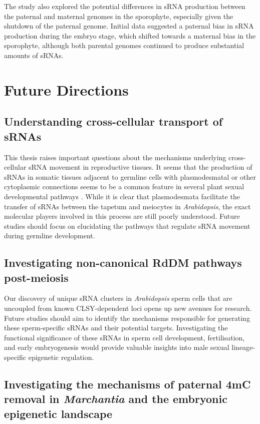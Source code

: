 The study also explored the potential differences in sRNA production between the paternal and maternal genomes in the sporophyte, especially given the shutdown of the paternal genome. Initial data suggested a paternal bias in sRNA production during the embryo stage, which shifted towards a maternal bias in the sporophyte, although both parental genomes continued to produce substantial amounts of sRNAs.

\section{Future Directions}

\subsection{Understanding cross-cellular transport of sRNAs}

This thesis raises important questions about the mechanisms underlying cross-cellular sRNA movement in reproductive tissues. It seems that the production of sRNAs in somatic tissues adjacent to germline cells with plasmodesmatal or other cytoplasmic connections seems to be a common feature in several plant sexual developmental pathways \cite{RN187,RN293,RN57,RN235}. While it is clear that plasmodesmata facilitate the transfer of sRNAs between the tapetum and meiocytes in \textit{Arabidopsis}, the exact molecular players involved in this process are still poorly understood. Future studies should focus on elucidating the pathways that regulate sRNA movement during germline development.

\subsection{Investigating non-canonical RdDM pathways post-meiosis}

Our discovery of unique sRNA clusters in \textit{Arabidopsis} sperm cells that are uncoupled from known CLSY-dependent loci opens up new avenues for research. Future studies should aim to identify the mechanisms responsible for generating these sperm-specific sRNAs and their potential targets. Investigating the functional significance of these sRNAs in sperm cell development, fertilisation, and early embryogenesis would provide valuable insights into male sexual lineage-specific epigenetic regulation.

\subsection{Investigating the mechanisms of paternal 4mC removal in \textit{Marchantia} and the embryonic epigenetic landscape}

